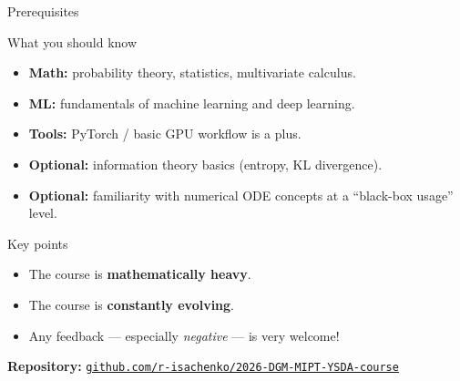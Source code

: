 \documentclass{beamer}
\begin{document}
\begin{frame}{Prerequisites}
    \begin{block}{What you should know}
        \begin{itemize}
            \setlength{\itemsep}{0.1em}
            \item \textbf{Math:} probability theory, statistics, multivariate calculus.
            \item \textbf{ML:} fundamentals of machine learning and deep learning.
            \item \textbf{Tools:} PyTorch / basic GPU workflow is a plus.
            \item \textbf{Optional:} information theory basics (entropy, KL divergence).
            \item \textbf{Optional:} familiarity with numerical ODE concepts at a ``black-box usage'' level.
        \end{itemize}
    \end{block}
    \eqpause
    \begin{block}{Key points}
        \begin{itemize}
            \setlength{\itemsep}{0.1em}
            \item The course is \textbf{mathematically heavy}.
            \item The course is \textbf{constantly evolving}.
            \item Any feedback --- especially \emph{negative} --- is very welcome!
        \end{itemize}
    \end{block}
    \eqpause
    \begin{center}
        \textbf{Repository:}\;\; \href{https://github.com/r-isachenko/2026-DGM-MIPT-YSDA-course}{\texttt{github.com/r-isachenko/2026-DGM-MIPT-YSDA-course}}
    \end{center}
\end{frame}
\end{document}
